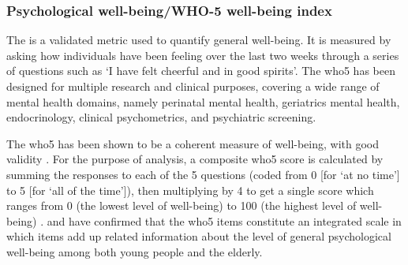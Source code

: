 \subsubsection*{Psychological well-being/WHO-5 well-being index}
The  is a validated metric used to quantify general well-being. It is measured by asking how individuals have been feeling over the last two weeks through a series of questions such as `I have felt cheerful and in good spirits'. The \gls{who5} has been designed for multiple research and clinical purposes, covering a wide range of mental health domains, namely perinatal mental health, geriatrics mental health, endocrinology, clinical psychometrics, and psychiatric screening.

The \gls{who5} has been shown to be a coherent measure of well-being, with good validity \citep{Topp2015WHO}. For the purpose of analysis, a composite \gls{who5} score is calculated by summing the responses to each of the 5 questions (coded from 0 [for `at no time'] to 5 [for `all of the time']), then multiplying by 4 to get a single score which ranges from 0 (the lowest level of well-being) to 100 (the highest level of well-being) \citep{Topp2015WHO}. \citet{Blom2012Screening} and \citet{LucasCarrasco2012Validity} have confirmed that the \gls{who5} items constitute an integrated scale in which items add up related information about the level of general psychological well-being among both young people and the elderly. 



